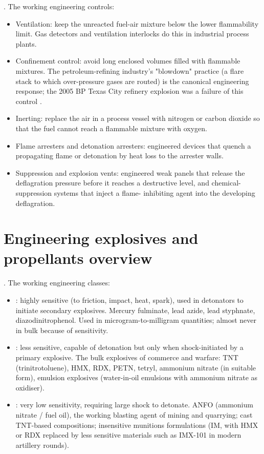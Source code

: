 . The
working engineering controls:

\begin{itemize}[leftmargin=*]
\item Ventilation: keep the unreacted fuel-air mixture below the
  lower flammability limit. Gas detectors and ventilation interlocks
  do this in industrial process plants.
\item Confinement control: avoid long enclosed volumes filled with
  flammable mixtures. The petroleum-refining industry's "blowdown"
  practice (a flare stack to which over-pressure gases are routed)
  is the canonical engineering response; the 2005 BP Texas City
  refinery explosion was a failure of this control
  \cite{acc:csb-bp-texas-city-2007}.
\item Inerting: replace the air in a process vessel with nitrogen or
  carbon dioxide so that the fuel cannot reach a flammable mixture
  with oxygen.
\item Flame arresters and detonation arresters: engineered devices
  that quench a propagating flame or detonation by heat loss to the
  arrester walls.
\item Suppression and explosion vents: engineered weak panels that
  release the deflagration pressure before it reaches a destructive
  level, and chemical-suppression systems that inject a flame-
  inhibiting agent into the developing deflagration.
\end{itemize}

\section{Engineering explosives and propellants overview}

. The working engineering classes:

\begin{itemize}[leftmargin=*]
\item {}: highly sensitive (to friction,
  impact, heat, spark), used in detonators to initiate secondary
  explosives. Mercury fulminate, lead azide, lead styphnate,
  diazodinitrophenol. Used in microgram-to-milligram quantities;
  almost never in bulk because of sensitivity.
\item {}: less sensitive, capable of
  detonation but only when shock-initiated by a primary explosive.
  The bulk explosives of commerce and warfare: TNT (trinitrotoluene),
  HMX, RDX, PETN, tetryl, ammonium nitrate (in suitable form),
  emulsion explosives (water-in-oil emulsions with ammonium nitrate
  as oxidiser).
\item {}: very low sensitivity, requiring
  large shock to detonate. ANFO (ammonium nitrate / fuel oil), the
  working blasting agent of mining and quarrying; cast TNT-based
  compositions; insensitive munitions formulations (IM, with HMX or
  RDX replaced by less sensitive materials such as IMX-101 in modern
  artillery rounds).
\end{itemize}


